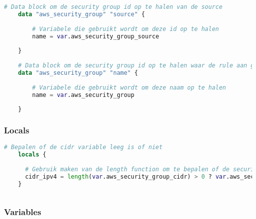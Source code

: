 \begin{lstlisting}[language=terraform]
    # Data block om de security group id op te halen van de source
    data "aws_security_group" "source" {
    
        # Variabele die gebruikt wordt om deze id op te halen
        name = var.aws_security_group_source
      
    }
    
    # Data block om de security group id op te halen waar de rule aan gelinkt zal worden
    data "aws_security_group" "name" {
    
        # Variabele die gebruikt wordt om deze naam op te halen
        name = var.aws_security_group
      
    }
\end{lstlisting}

\subsubsection{
{Locals}}

\begin{lstlisting}[language=terraform]
    # Bepalen of de cidr variable leeg is of niet
    locals {
    
      # Gebruik maken van de length function om te bepalen of de security group cidr is leeg, indien leeg return a null object
      cidr_ipv4 = length(var.aws_security_group_cidr) > 0 ? var.aws_security_group_cidr : null
    }
    
\end{lstlisting}

\subsubsection{
{Variables}}

